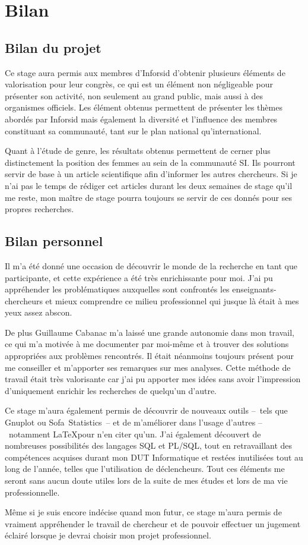 \cleardoublepage
{}

\chapter{Bilan}

\section{Bilan du projet}
	Ce stage aura permis aux membres d'Inforsid d'obtenir plusieurs éléments de valorisation pour leur congrès, ce qui est un élément non négligeable pour présenter son activité, non seulement au grand public, mais aussi à des organismes officiels. Les élément obtenus permettent de présenter les thèmes abordés par Inforsid mais également la diversité et l'influence des membres constituant sa communauté, tant sur le plan national qu'international.
	
	Quant à l'étude de genre, les résultats obtenus permettent de cerner plus distinctement la position des femmes au sein de la communauté SI. Ils pourront servir de base à un article scientifique afin d'informer les autres chercheurs. Si je n'ai pas le temps de rédiger cet articles durant les deux semaines de stage qu'il me reste, mon maître de stage pourra toujours se servir de ces donnés pour ses propres recherches.



\section{Bilan personnel}
	Il m'a été donné une occasion de découvrir le monde de la recherche en tant que participante, et cette expérience a été très enrichissante pour moi. J'ai pu appréhender les problématiques auxquelles sont confrontés les enseignants-chercheurs et mieux comprendre ce milieu professionnel qui jusque là était à mes yeux assez abscon.
	
	De plus Guillaume Cabanac m'a laissé une grande autonomie dans mon travail, ce qui m'a motivée à me documenter par moi-même et à trouver des solutions appropriées aux problèmes rencontrés. Il était néanmoins toujours présent pour me conseiller et m'apporter ses remarques sur mes analyses. Cette méthode de travail était très valorisante car j'ai pu apporter mes idées sans avoir l'impression d'uniquement enrichir les recherches de quelqu'un d'autre.
	
	Ce stage m'aura également permis de découvrir de nouveaux outils --~tels que Gnuplot ou Sofa~Statistics~-- et de m'améliorer dans l'usage d'autres --~notamment \LaTeX pour n'en citer qu'un. J'ai également découvert de nombreuses possibilités des langages SQL et PL/SQL, tout en retravaillant des compétences acquises durant mon DUT Informatique et restées inutilisées tout au long de l'année, telles que l'utilisation de déclencheurs. Tout ces éléments me seront sans aucun doute utiles lors de la suite de mes études et lors de ma vie professionnelle.
	
	Même si je suis encore indécise quand mon futur, ce stage m'aura permis de vraiment appréhender le travail de chercheur et de pouvoir effectuer un jugement éclairé lorsque je devrai choisir mon projet professionnel.
